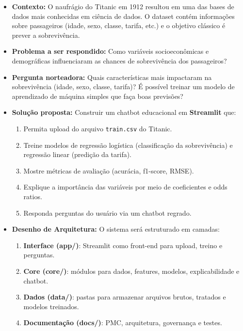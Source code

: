 \documentclass[12pt,a4paper]{article}
\begin{document}
\begin{itemize}
  \item \textbf{Contexto:}  
  O naufrágio do Titanic em 1912 resultou em uma das bases de dados mais conhecidas em ciência de dados. O dataset contém informações sobre passageiros (idade, sexo, classe, tarifa, etc.) e o objetivo clássico é prever a sobrevivência.

  \item \textbf{Problema a ser respondido:}  
  Como variáveis socioeconômicas e demográficas influenciaram as chances de sobrevivência dos passageiros?

  \item \textbf{Pergunta norteadora:}  
  Quais características mais impactaram na sobrevivência (idade, sexo, classe, tarifa)?  
  É possível treinar um modelo de aprendizado de máquina simples que faça boas previsões?

  \item \textbf{Solução proposta:}  
  Construir um chatbot educacional em \textbf{Streamlit} que:  
  \begin{enumerate}
    \item Permita upload do arquivo \texttt{train.csv} do Titanic.  
    \item Treine modelos de regressão logística (classificação da sobrevivência) e regressão linear (predição da tarifa).  
    \item Mostre métricas de avaliação (acurácia, f1-score, RMSE).  
    \item Explique a importância das variáveis por meio de coeficientes e odds ratios.  
    \item Responda perguntas do usuário via um chatbot regrado.  
  \end{enumerate}

    \item \textbf{Desenho de Arquitetura:}  
    O sistema será estruturado em camadas:  
    \begin{enumerate}
      \item \textbf{Interface (app/)}: Streamlit como front-end para upload, treino e perguntas.  
      \item \textbf{Core (core/)}: módulos para dados, features, modelos, explicabilidade e chatbot.  
      \item \textbf{Dados (data/)}: pastas para armazenar arquivos brutos, tratados e modelos treinados.  
      \item \textbf{Documentação (docs/)}: PMC, arquitetura, governança e testes.  
    \end{enumerate}
    

\end{itemize}
\end{document}

